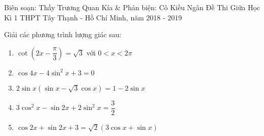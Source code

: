 \begin{name}
{Biên soạn: Thầy Trương Quan Kía \& Phản biện: Cô Kiều Ngân}
{Đề Thi Giữa Học Kì 1 THPT Tây Thạnh - Hồ Chí Minh, năm 2018 - 2019}
\end{name}

\setcounter{ex}{0}\setcounter{bt}{0}

\begin{bt}%
Giải các phương trình lượng giác sau:
\begin{enumerate}
	\item $ \cot \left( 2x-\dfrac{\pi}{3}\right) =\sqrt{3} $ với $ 0<x<2\pi $
	\item $ \cos 4x -4\sin^2 x+3=0 $
	\item $ 2\sin x\left( \sin x -\sqrt{3}\cos x\right) =1-2\sin x $
	\item $ 3\cos^2 x-\sin 2x +2\sin^2 x=\dfrac{3}{2} $
	\item $ \cos 2x+\sin 2x+3=\sqrt{2}\left( 3\cos x+\sin x\right)  $
\end{enumerate}
\end{bt}
